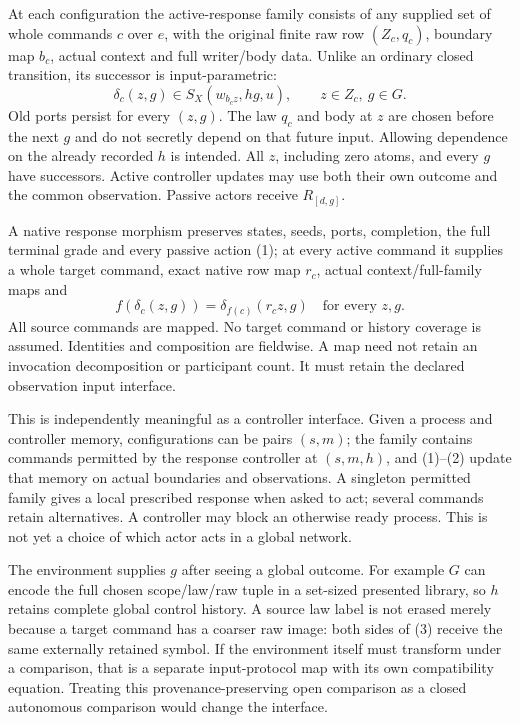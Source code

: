 \documentclass[11pt]{article}
\begin{document}
At each configuration the active-response family consists of any supplied set of whole commands $c$ over $e$, with the original finite raw row $(Z_c,q_c)$, boundary map $b_c$, actual context and full writer/body data. Unlike an ordinary closed transition, its successor is input-parametric:
\[
 \delta_c(z,g)\in S_X(w_{b_cz},hg,u),\qquad z\in Z_c,\ g\in G. \tag{2}
\]
Old ports persist for every $(z,g)$. The law $q_c$ and body at $z$ are chosen before the next $g$ and do not secretly depend on that future input. Allowing dependence on the already recorded $h$ is intended. All $z$, including zero atoms, and every $g$ have successors. Active controller updates may use both their own outcome and the common observation. Passive actors receive $R_{[d,g]}$.

A native response morphism preserves states, seeds, ports, completion, the full terminal grade and every passive action (1); at every active command it supplies a whole target command, exact native row map $r_c$, actual context/full-family maps and
\[
       f(\delta_c(z,g))=\delta_{f(c)}(r_cz,g)
                  \quad\text{for every }z,g.           \tag{3}
\]
All source commands are mapped. No target command or history coverage is assumed. Identities and composition are fieldwise. A map need not retain an invocation decomposition or participant count. It must retain the declared observation input interface.

This is independently meaningful as a controller interface. Given a process and controller memory, configurations can be pairs $(s,m)$; the family contains commands permitted by the response controller at $(s,m,h)$, and (1)--(2) update that memory on actual boundaries and observations. A singleton permitted family gives a local prescribed response when asked to act; several commands retain alternatives. A controller may block an otherwise ready process. This is not yet a choice of which actor acts in a global network.

The environment supplies $g$ after seeing a global outcome. For example $G$ can encode the full chosen scope/law/raw tuple in a set-sized presented library, so $h$ retains complete global control history. A source law label is not erased merely because a target command has a coarser raw image: both sides of (3) receive the same externally retained symbol. If the environment itself must transform under a comparison, that is a separate input-protocol map with its own compatibility equation. Treating this provenance-preserving open comparison as a closed autonomous comparison would change the interface.
\end{document}
